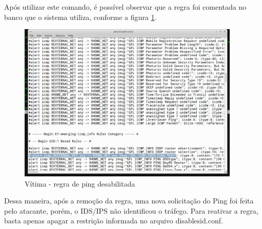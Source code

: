 Após utilizar este comando, é possível observar que a regra foi comentada no banco
que o sistema utiliza, conforme a figura \ref{fig:regra_desativada}.

 \begin{figure}[h]
  \centering
  \includegraphics[width=400px, scale=1]{resource/regra_desativada}
  \caption{Vítima - regra de ping desabilitada}
\label{fig:regra_desativada}
\end{figure}

Dessa maneira, após a remoção da regra, uma nova solicitação do Ping foi feita
 pelo atacante, porém, o IDS/IPS não identificou o tráfego. Para reativar a regra,
 basta apenas apagar a restrição informada no arquivo disablesid.conf.
